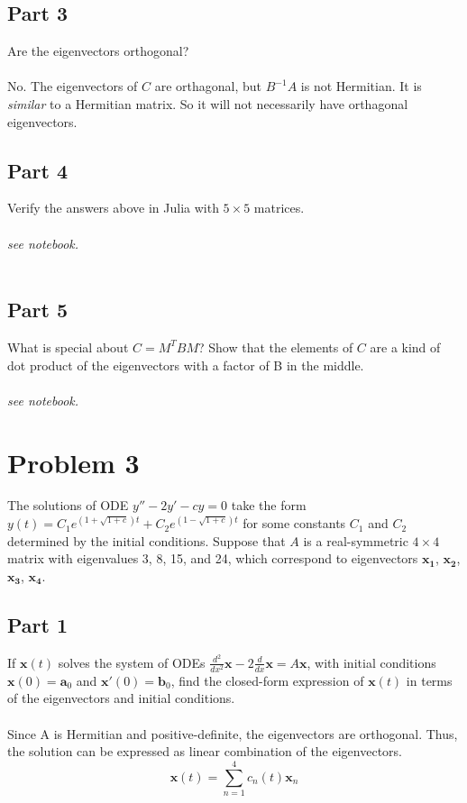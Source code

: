 \documentclass{amsart}
\begin{document}
	\subsection{Part 3}
	Are the eigenvectors orthogonal?
	\\\\
	No. The eigenvectors of $C$ are orthagonal, but $B^{-1}A$ is not Hermitian. It is \textit{similar} to a Hermitian matrix. So it will not necessarily have orthagonal eigenvectors.
	
	\subsection{Part 4}
	Verify the answers above in Julia with $5\times 5$ matrices.
	\\\\
	\textit{see notebook.}
	\\\\
	\subsection{Part 5}
	What is special about $C=M^{T}BM$? Show that the elements of $C$ are a kind of dot product of the eigenvectors with a factor of B in the middle.
	\\\\
	\textit{see notebook.}
	
	\section{Problem 3}
	The solutions of ODE $y'' - 2y' - cy = 0$ take the form $y(t) = C_1 e^{(1+\sqrt{1+c})t} + C_2 e^{(1-\sqrt{1+c})t}$ for some constants $C_1$ and $C_2$ determined by the initial conditions. Suppose that $A$ is a real-symmetric $4 \times 4$ matrix with eigenvalues 3, 8, 15, and 24, which correspond to eigenvectors $\mathbf{x_1}$, $\mathbf{x_2}$, $\mathbf{x_3}$, $\mathbf{x_4}$.
	\subsection{Part 1}
	If $\mathbf{x}(t)$ solves the system of ODEs $\frac{d^2}{dx^2}\mathbf{x} - 2\frac{d}{dx}\mathbf{x} = A\mathbf{x}$, with initial conditions $\mathbf{x}(0) = \mathbf{a}_0$ and $\mathbf{x}'(0) = \mathbf{b}_0$, find the closed-form expression of $\mathbf{x}(t)$ in terms of the eigenvectors and initial conditions.
	\\\\
	Since A is Hermitian and positive-definite, the eigenvectors are orthogonal. Thus, the solution can be expressed as linear combination of the eigenvectors.
	\[\mathbf{x}(t) = \sum_{n=1}^{4} c_n(t) \mathbf{x}_n \]
	
\end{document}
